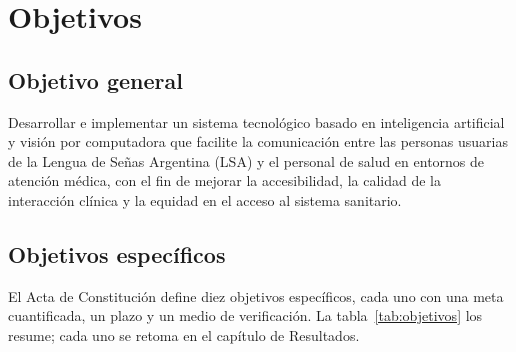 \chapter{Objetivos}

\section{Objetivo general}

Desarrollar e implementar un sistema tecnológico basado en inteligencia artificial y visión por computadora que facilite la comunicación entre las personas usuarias de la Lengua de Señas Argentina (LSA) y el personal de salud en entornos de atención médica, con el fin de mejorar la accesibilidad, la calidad de la interacción clínica y la equidad en el acceso al sistema sanitario.

\section{Objetivos específicos}

El Acta de Constitución define diez objetivos específicos, cada uno con una meta cuantificada, un plazo y un medio de verificación. La tabla~\ref{tab:objetivos} los resume; cada uno se retoma en el capítulo de Resultados.

